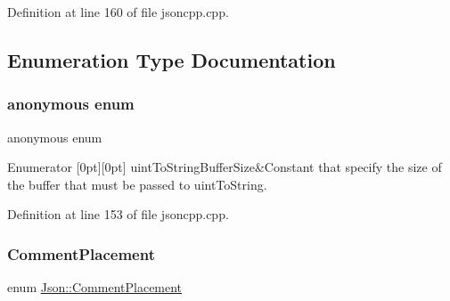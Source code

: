 Definition at line 160 of file jsoncpp.\+cpp.



\subsection{Enumeration Type Documentation}
\hypertarget{namespace_json_aaadda4b3969b65336128f046fccf90a7}{}\label{namespace_json_aaadda4b3969b65336128f046fccf90a7} 
\subsubsection{\texorpdfstring{anonymous enum}{anonymous enum}}
{\footnotesize\ttfamily anonymous enum}

\begin{DoxyEnumFields}{Enumerator}
[0pt][0pt]{}\hypertarget{namespace_json_aaadda4b3969b65336128f046fccf90a7ae4f2008c7919f20d81286121d1374424}{}\label{namespace_json_aaadda4b3969b65336128f046fccf90a7ae4f2008c7919f20d81286121d1374424} 
uint\+To\+String\+Buffer\+Size&Constant that specify the size of the buffer that must be passed to uint\+To\+String. \\
\hline

\end{DoxyEnumFields}


Definition at line 153 of file jsoncpp.\+cpp.

\hypertarget{namespace_json_a4fc417c23905b2ae9e2c47d197a45351}{}\label{namespace_json_a4fc417c23905b2ae9e2c47d197a45351} 
\subsubsection{\texorpdfstring{Comment\+Placement}{CommentPlacement}\hspace{0.1cm}{\footnotesize\ttfamily [1/2]}}
{\footnotesize\ttfamily enum \hyperlink{namespace_json_a4fc417c23905b2ae9e2c47d197a45351}{Json\+::\+Comment\+Placement}}

